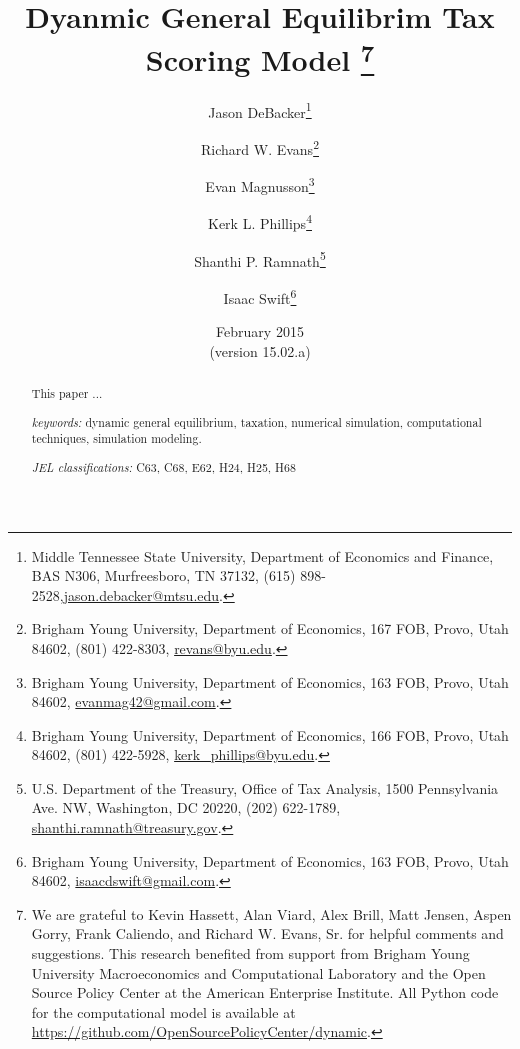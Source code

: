 \documentclass[letterpaper,12pt]{article}
\theoremstyle{definition}
\begin{document}
\begin{titlepage}
  \title{Dyanmic General Equilibrim Tax Scoring Model
    \thanks{We are grateful to Kevin Hassett, Alan Viard, Alex Brill, Matt Jensen, Aspen Gorry, Frank Caliendo, and Richard W. Evans, Sr. for helpful comments and suggestions. This research benefited from support from Brigham Young University Macroeconomics and Computational Laboratory and the Open Source Policy Center at the American Enterprise Institute. All Python code for the computational model is available at \href{https://github.com/OpenSourcePolicyCenter/dynamic}{https://github.com/OpenSourcePolicyCenter/dynamic}.} }

  \author{
  Jason DeBacker\footnote{Middle Tennessee State University, Department of Economics and Finance, BAS N306, Murfreesboro, TN 37132, (615) 898-2528,\href{mailto:jason.debacker@mtsu.edu}{jason.debacker@mtsu.edu}.} \\[-2pt]
  \and
  Richard W. Evans\footnote{Brigham Young University, Department of Economics, 167 FOB, Provo, Utah 84602, (801) 422-8303, \href{mailto:revans@byu.edu}{revans@byu.edu}.} \\[-2pt]
  \and
  Evan Magnusson\footnote{Brigham Young University, Department of Economics, 163 FOB, Provo, Utah 84602, \href{mailto:evanmag42@gmail.com}{evanmag42@gmail.com}.} \\[-2pt]
  \and
  Kerk L. Phillips\footnote{Brigham Young University, Department of Economics, 166 FOB, Provo, Utah 84602, (801) 422-5928, \href{mailto:kerk_phillips@byu.edu}{kerk\_phillips@byu.edu}.} \\[-2pt]
  \and
  Shanthi P. Ramnath\footnote{U.S. Department of the Treasury, Office of Tax Analysis, 1500 Pennsylvania Ave. NW, Washington, DC 20220, (202) 622-1789, \href{mailto:shanthi.ramnath@treasury.gov}{shanthi.ramnath@treasury.gov}.} \\[-2pt]
  \and
  Isaac Swift\footnote{Brigham Young University, Department of Economics, 163 FOB, Provo, Utah 84602, \href{mailto:isaacdswift@gmail.com}{isaacdswift@gmail.com}.} \\[-2pt]}
  \date{February 2015 \\
  \scriptsize{(version 15.02.a)}}
  \maketitle
  \begin{abstract}
  \small{This paper ...

  \vspace{0.3in}

  \textit{keywords:} dynamic general equilibrium, taxation, numerical simulation, computational techniques, simulation modeling.

  \vspace{0.3in}

  \textit{JEL classifications:} C63, C68, E62, H24, H25, H68}
  \end{abstract}
  \thispagestyle{empty}
\end{titlepage}
\end{document}
